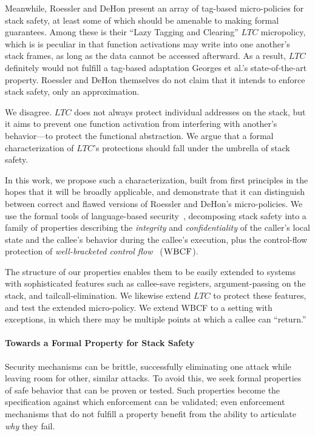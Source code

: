 Meanwhile, Roessler and DeHon \cite{DBLP:conf/sp/RoesslerD18} present an array of tag-based
micro-policies for stack safety, at least some of which should be amenable to making
formal guarantees. Among these is their ``Lazy Tagging and Clearing'' \(LTC\) micropolicy,
which is is peculiar in that function activations may write into one another's stack frames,
as long as the data cannot be accessed afterward. As a result, \(LTC\) definitely would not
fulfill a tag-based adaptation Georges et al.'s state-of-the-art property.
Roessler and DeHon themselves do not claim that it intends to enforce stack safety,
only an approximation.

We disagree. \(LTC\) does not always protect individual addresses on the stack, but it aims
to prevent one function activation from interfering with another's behavior---to protect
the functional abstraction. We argue that a formal characterization of \(LTC\)'s protections
should fall under the umbrella of stack safety.

In this work, we propose such a characterization, built from first principles
in the hopes that it will be broadly applicable, and demonstrate
that it can distinguish between correct and flawed versions of Roessler and DeHon's
micro-policies. We use the formal tools of language-based
security~\cite{sabelfeld2003language}, decomposing stack safety into a family of
properties describing
the {\em integrity} and {\em confidentiality} of the caller’s local state
and the callee's behavior during the callee's execution, plus the control-flow protection
of {\em well-bracketed control flow}~\cite{SkorstengaardSTKJFP} (\(\textnormal{\sc WBCF}\)).

The structure of our properties enables them to be easily extended to systems with
sophisticated features such as callee-save registers, argument-passing on the stack,
and tailcall-elimination. We likewise extend \(LTC\) to protect these features, and
test the extended micro-policy.
\ifexceptions
We extend WBCF to a setting with exceptions,
in which there may be multiple points at which a callee can ``return.''
\fi

\paragraph{Towards a Formal Property for Stack Safety}

Security mechanisms can be brittle, successfully eliminating one attack while leaving room for
other, similar attacks. To avoid this, we seek formal properties of safe behavior that can be proven
or tested. Such properties become the specification against which enforcement can be validated;
even enforcement mechanisms that do not fulfill a property benefit from the ability to articulate
\emph{why} they fail.

